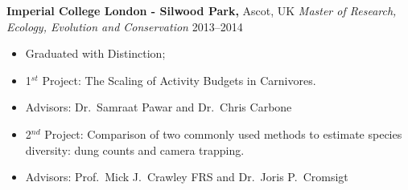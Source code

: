 
\vspace{5pt}

\textbf{Imperial College London - Silwood Park,} Ascot, UK \newline
\emph{Master of Research, Ecology, Evolution and Conservation}
\hfill{2013--2014}
\begin{itemize}
  \item Graduated with Distinction;
  \item 1$^{st}$ Project: The Scaling of Activity Budgets in Carnivores.
  \item Advisors: Dr.~Samraat Pawar and Dr.~Chris Carbone
  \item 2$^{nd}$ Project: Comparison of two commonly used methods to estimate species diversity: dung counts and camera trapping.
  \item Advisors: Prof.~Mick J.~Crawley FRS and Dr.~Joris P.~Cromsigt
\end{itemize}
